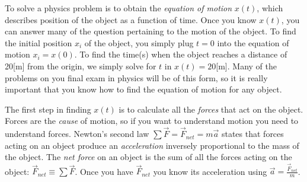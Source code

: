 
To solve a physics problem is to obtain the \emph{equation of motion} $x(t)$, 
which describes position of the object as a function of time.
%
Once you know $x(t)$, you can answer many of the question pertaining to the motion of the object.
To find the initial position $x_i$ of the object, you simply plug $t=0$ into the equation of motion $x_i = x(0)$.
To find the time(s) when the object reaches a distance of 20[m] from the origin, we simply solve for $t$ in $x(t)=20$[m].
Many of the problems on you final exam in physics will be of this form, so it is really important that you know
how to find the equation of motion for any object.

The first step in finding $x(t)$ is to calculate all the \emph{forces} that act on the object.
Forces are the \emph{cause} of motion, so if you want to understand motion you need to understand forces. 
Newton's second law $\sum \vec{F} = \vec{F}_{net}=m\vec{a}$ states that forces acting on an object 
produce an \emph{acceleration} inversely proportional to the mass of the object. 
The \emph{net force} on an object is the sum of all the forces acting on the object: 
$\vec{F}_{net} \equiv \sum \vec{F}$. Once you have $\vec{F}_{net}$ you know its 
acceleration using $\vec{a}=\frac{\vec{F}_{net}}{m}$.

